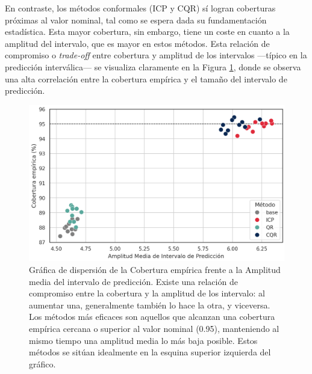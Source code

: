 En contraste, los métodos conformales (ICP y CQR) sí logran coberturas próximas al valor nominal, tal como se espera dada su fundamentación estadística. Esta mayor cobertura, sin embargo, tiene un coste en cuanto a la amplitud del intervalo, que es mayor en estos métodos. Esta relación de compromiso o \textit{trade-off} entre cobertura y amplitud de los intervalos ---típico en la predicción interválica--- se visualiza claramente en la Figura \ref{fig:AE_scatterplot_EC-MPIW}, donde se observa una alta correlación entre la cobertura empírica y el tamaño del intervalo de predicción.

\begin{figure}[htbp]
    \centering
    \includegraphics[width=\textwidth]{capitulos/cap_05/imagenes/AE_scatterplot_EC-MPIW.png}
    \caption[
        Gráfica de dispersión de la Cobertura empírica frente a la Amplitud media del intervalo de predicción. 
    ]{
        Gráfica de dispersión de la Cobertura empírica frente a la Amplitud media del intervalo de predicción. 
        Existe una relación de compromiso entre la cobertura y la amplitud de los intervalo: al aumentar una, generalmente también lo hace la otra, y viceversa. Los métodos más eficaces son aquellos que alcanzan una cobertura empírica cercana o superior al valor nominal (0.95), manteniendo al mismo tiempo una amplitud media lo más baja posible. Estos métodos se sitúan idealmente en la esquina superior izquierda del gráfico.
    }
    \label{fig:AE_scatterplot_EC-MPIW}
\end{figure}

